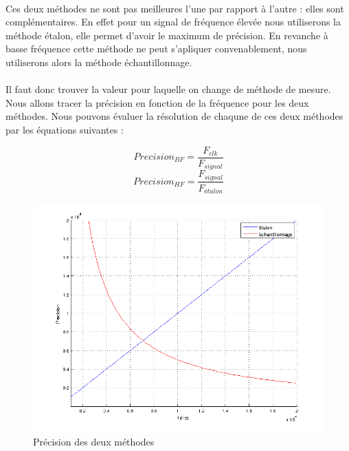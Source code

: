 \documentclass[a4paper,11pt]{article}
\begin{document}
  \paragraph{} Ces deux méthodes ne sont pas meilleures l'une par rapport à l'autre : elles sont complémentaires.
  En effet pour un signal de fréquence élevée nous utiliserons la méthode étalon, elle permet d'avoir le maximum de précision.
  En revanche à basse fréquence cette méthode ne peut s'apliquer convenablement, nous utiliserons alors la méthode échantillonnage.

  \paragraph{}Il faut donc trouver la valeur pour laquelle on change de méthode de mesure. Nous allons tracer la précision en fonction de la fréquence pour 
  les deux méthodes. Nous pouvons évaluer la résolution de chaqune de ces deux méthodes par les équations suivantes :

  \begin{equation*}
  Precision_{BF}= \frac{F_{clk}}{F_{signal}}
  \end{equation*}
  \begin{equation*}
  Precision_{HF}= \frac{F_{signal}}{F_{étalon}}
  \end{equation*}

\begin{figure}[H]
\begin{center}
	\includegraphics[scale=.7]{graphMethode.png}
	\caption{Précision des deux méthodes}
\end{center}
\end{figure}
\end{document}
